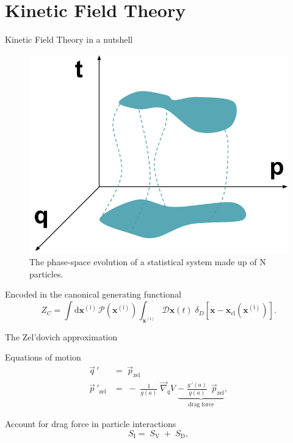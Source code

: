 \documentclass[10pt]{beamer}
\begin{document}
\section{Kinetic Field Theory}
\begin{frame}[fragile]{Kinetic Field Theory in a nutshell}
\begin{figure}[h]
	\centering
	\includegraphics[width=0.6 \textwidth]{KFT.png}
	\caption{The phase-space evolution of a statistical system made up of N particles.}
\end{figure}
\begin{block}{Encoded in the canonical generating functional}
\begin{equation*}
Z_C = \int \textrm{d}\boldsymbol{ x}^{(\mathrm{i})} \, \mathcal{P}(\boldsymbol{ x}^{(\mathrm{i})})  \int_{\boldsymbol{ x}^{(\mathrm{i})}}  \mathcal{D}\boldsymbol{x} (t)  \; \delta_D\left[\boldsymbol{ x} -\boldsymbol{ x}_{\mathrm{cl}}(\boldsymbol{x}^{(\mathrm{i})})\right].
\end{equation*}

\end{block}

\end{frame}
\begin{frame}[fragile]{The Zel'dovich approximation}
\begin{block}{Equations of motion}
\begin{align}
\vec{q} \, '&=\; \vec{p}_{\mathrm{zel}} \nonumber\\
\vec{p}\,' _{\mathrm{zel}} & = \;-\; \frac{1}{g(a)}\; \vec{\nabla}_q V \; \underbrace{- \;\frac{g\,'(a)}{g(a)} \;\,\vec{p}_{\mathrm{zel}}}_{ \mathrm{drag \; force}}\label{eq:eom},
\end{align}
\end{block}
\begin{block}{Account for drag force in particle interactions}
	\vspace{0.3 cm}
	\begin{equation}
	S_{\mathrm{I}} = \;S_{\mathrm{V}} \;+\; S_{\mathrm{D}},
	\end{equation}
\end{block}
\end{frame}
\end{document}
